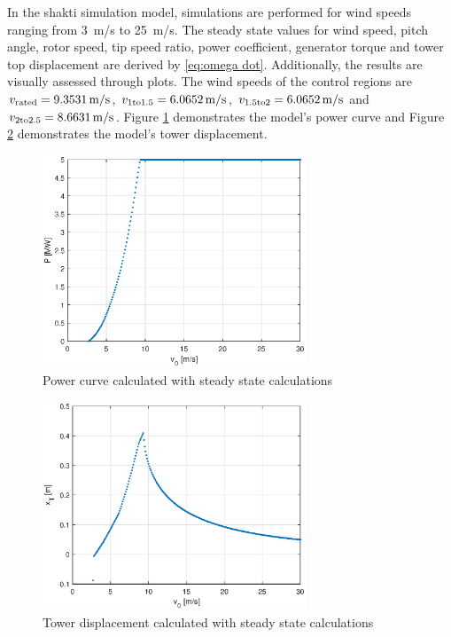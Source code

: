 In the \gls{shakti} simulation model, simulations are performed for wind speeds ranging from \SI{3}{m/s} to \SI{25}{m/s}.
The steady state values for wind speed, pitch angle, rotor speed, tip speed ratio, power coefficient, generator torque and tower top displacement are derived by \ref{eq:omega dot}.
Additionally, the results are visually assessed through plots.
The wind speeds of the control regions are $v_{\textnormal{rated}} = \SI{9.3531}{m/s}$, $v_{\textnormal{1to1.5}} = \SI{6.0652}{m/s}$, $v_{\textnormal{1.5to2}} = \SI{6.0652}{m/s}$ and $v_{\textnormal{2to2.5}} = \SI{8.6631}{m/s}$. Figure \ref{fig:power cureve} demonstrates the model's power curve and Figure \ref{fig:Tower displacement} demonstrates the model's tower displacement.

\begin{figure}[h]
	\centering
	\includegraphics[width=0.7\textwidth]{Figures/P_Vs_v.eps}
	\caption{Power curve calculated with steady state calculations}
	\label{fig:power cureve} 
\end{figure}

\begin{figure}[h]
	\centering
	\includegraphics[width=0.7\textwidth]{Figures/Tower_top_displacement.eps}
	\caption{Tower displacement calculated with steady state calculations}
	\label{fig:Tower displacement} 
\end{figure}
